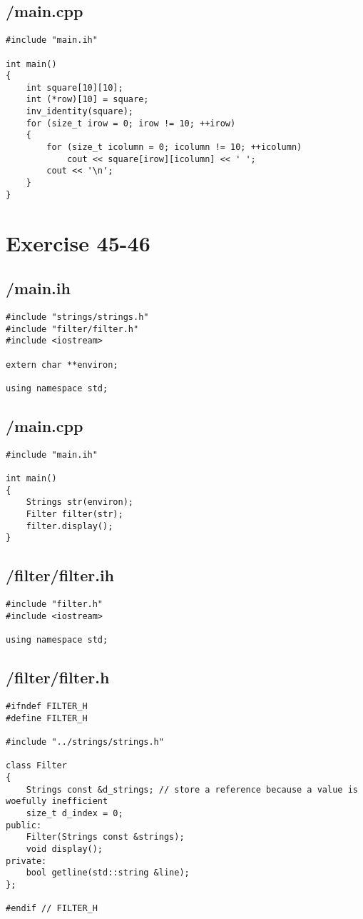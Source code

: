 \documentclass{article}
\begin{document}
\subsection*{/main.cpp}
\begin{verbatim}
#include "main.ih"

int main()
{
    int square[10][10];
    int (*row)[10] = square;
    inv_identity(square);
    for (size_t irow = 0; irow != 10; ++irow)
    {
        for (size_t icolumn = 0; icolumn != 10; ++icolumn)
            cout << square[irow][icolumn] << ' ';
        cout << '\n';
    }
}
\end{verbatim}

\section*{Exercise 45-46}
\subsection*{/main.ih}
\begin{verbatim}
#include "strings/strings.h"
#include "filter/filter.h"
#include <iostream>

extern char **environ;

using namespace std;

\end{verbatim}
\subsection*{/main.cpp}
\begin{verbatim}
#include "main.ih"

int main()
{
    Strings str(environ);
    Filter filter(str);
    filter.display();
}
\end{verbatim}
\subsection*{/filter/filter.ih}
\begin{verbatim}
#include "filter.h"
#include <iostream>

using namespace std;

\end{verbatim}
\subsection*{/filter/filter.h}
\begin{verbatim}
#ifndef FILTER_H
#define FILTER_H

#include "../strings/strings.h"

class Filter 
{
    Strings const &d_strings; // store a reference because a value is woefully inefficient
    size_t d_index = 0;
public:
    Filter(Strings const &strings);
    void display();
private:
    bool getline(std::string &line);
};

#endif // FILTER_H

\end{verbatim}
\end{document}
